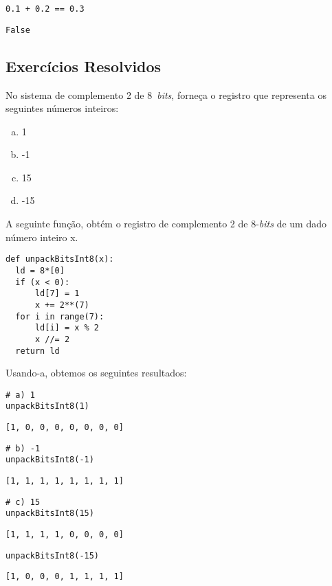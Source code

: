 \begin{lstlisting}
0.1 + 0.2 == 0.3
\end{lstlisting}

\begin{verbatim}
False
\end{verbatim}

\subsection{Exercícios Resolvidos}

\begin{exeresol}
  No sistema de complemento 2 de 8~{\it bits}, forneça o registro que representa os seguintes números inteiros:
  \begin{enumerate}[a)]
  \item 1
  \item -1
  \item 15
  \item -15
  \end{enumerate}
\end{exeresol}
\begin{resol}
  A seguinte função, obtém o registro de complemento 2 de 8-{\it bits} de um dado número inteiro x.

\begin{lstlisting}
def unpackBitsInt8(x):
  ld = 8*[0]
  if (x < 0):
      ld[7] = 1
      x += 2**(7)
  for i in range(7):
      ld[i] = x % 2
      x //= 2
  return ld
\end{lstlisting}

Usando-a, obtemos os seguintes resultados:

\begin{lstlisting}
# a) 1
unpackBitsInt8(1)
\end{lstlisting}

\begin{verbatim}
[1, 0, 0, 0, 0, 0, 0, 0]
\end{verbatim}

\begin{lstlisting}
# b) -1
unpackBitsInt8(-1)
\end{lstlisting}

\begin{verbatim}
[1, 1, 1, 1, 1, 1, 1, 1]
\end{verbatim}

\begin{lstlisting}
# c) 15
unpackBitsInt8(15)
\end{lstlisting}

\begin{verbatim}
[1, 1, 1, 1, 0, 0, 0, 0]
\end{verbatim}

\begin{lstlisting}
unpackBitsInt8(-15)
\end{lstlisting}

\begin{verbatim}
[1, 0, 0, 0, 1, 1, 1, 1]
\end{verbatim}

\end{resol}


